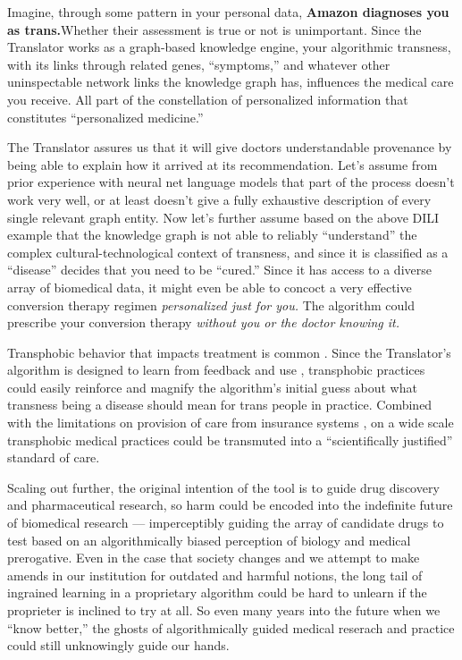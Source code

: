 \documentclass[11pt]{article}
\begin{document}
\begin{multicols}{2}
Imagine, through some pattern in your personal data, \textbf{Amazon
diagnoses you as trans.}Whether their assessment is true or not is
unimportant. Since the Translator works as a graph-based knowledge
engine, your algorithmic transness, with its links through related
genes, ``symptoms,'' and whatever other uninspectable network links the
knowledge graph has, influences the medical care you receive. All part
of the constellation of personalized information that constitutes
``personalized medicine.''

The Translator assures us that it will give doctors understandable
provenance by being able to explain how it arrived at its
recommendation. Let's assume from prior experience with neural net
language models that part of the process doesn't work very well, or at
least doesn't give a fully exhaustive description of every single
relevant graph entity. Now let's further assume based on the above DILI
example that the knowledge graph is not able to reliably ``understand''
the complex cultural-technological context of transness, and since it is
classified as a ``disease'' decides that you need to be ``cured.'' Since
it has access to a diverse array of biomedical data, it might even be
able to concoct a very effective conversion therapy regimen
\emph{personalized just for you.} The algorithm could prescribe your
conversion therapy \emph{without you or the doctor knowing it.}

Transphobic behavior that impacts treatment is common \cite{ramTransphobiaEncodedExamination2021, strangioCanReproductiveTrans2016} . Since the Translator's algorithm is designed to learn from
feedback and use\cite{consortiumUniversalBiomedicalData2019} ,
transphobic practices could easily reinforce and magnify the algorithm's
initial guess about what transness being a disease should mean for trans
people in practice. Combined with the limitations on provision of care
from insurance systems \cite{strangioCanReproductiveTrans2016} ,
on a wide scale transphobic medical practices could be transmuted into a
``scientifically justified'' standard of care.

Scaling out further, the original intention of the tool is to guide drug
discovery and pharmaceutical research, so harm could be encoded into the
indefinite future of biomedical research --- imperceptibly guiding the
array of candidate drugs to test based on an algorithmically biased
perception of biology and medical prerogative. Even in the case that
society changes and we attempt to make amends in our institution for
outdated and harmful notions, the long tail of ingrained learning in a
proprietary algorithm could be hard to unlearn if the proprieter is
inclined to try at all. So even many years into the future when we
``know better,'' the ghosts of algorithmically guided medical reserach
and practice could still unknowingly guide our hands.


\end{multicols}
\end{document}
